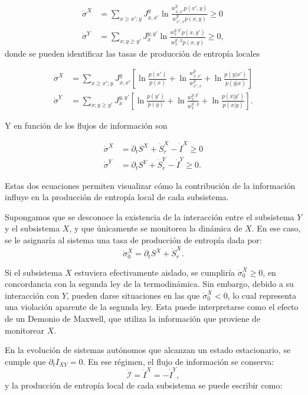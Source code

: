 \begin{align*}
    \dot{\sigma}^{X} & = \sum_{x \geq x';y} J_{x,x'}^{y} \ln  \frac{w_{x,x'}^{y} p(x',y) }{w_{x',x}^{y} p(x,y) } \geq 0 \\
    \dot{\sigma}^{Y} & = \sum_{x;y\geq y'}J_{x}^{y,y'} \ln \frac{w_{x}^{y,y'} p(x,y') }{ w_{x}^{y',y} p(x,y) } \geq 0, 
\end{align*}
donde se pueden identificar las tasas de producción de entropía locales

\begin{align*}
    \dot{\sigma}^{X} &  = \sum_{x \geq x';y} J_{x,x'}^{y} \left[ \ln \frac{p(x')}{p(x)}  +\ln \frac{w_{x,x'}^{y}}{ w_{x',x}^{y} } + \ln \frac{p(y|x')}{p(y|x)} \right] \\
    \dot{\sigma}^{Y} &  = \sum_{x;y \geq y'} J_{x}^{y,y'} \left[ \ln \frac{p(y')}{p(y)}  + \ln \frac{w_{x}^{y,y'}}{ w_{x}^{y',y} } + \ln \frac{p(x|y')}{p(x|y)} \right].
\end{align*}

Y en función de los flujos de información son  

\begin{align*}
    \dot{\sigma}^{X} & = \partial_{t}S^{X} + \dot{S}_{r}^{X} - \dot{I}^{X} \geq 0 \\
    \dot{\sigma}^{Y} & = \partial_{t}S^{Y} + \dot{S}_{r}^{Y} - \dot{I}^{Y} \geq 0.
\end{align*}

Estas dos ecuaciones permiten visualizar cómo la contribución de la información influye en la producción de entropía local de cada subsistema.

Supongamos que se desconoce la existencia de la interacción entre el subsistema \( Y \) y el subsistema \( X \), y que únicamente se monitorea la dinámica de \( X \). En ese caso, se le asignaría al sistema una tasa de producción de entropía dada por:
\[
\dot{\sigma}^{X}_0 = \partial_t S^X + \dot{S}_r^X.
\]

Si el subsistema \( X \) estuviera efectivamente aislado, se cumpliría \( \dot{\sigma}^{X}_0 \geq 0 \), en concordancia con la segunda ley de la termodinámica. Sin embargo, debido a su interacción con \( Y \), pueden darse situaciones en las que \( \dot{\sigma}^{X}_0 < 0 \), lo cual representa una violación aparente de la segunda ley. Esta puede interpretarse como el efecto de un Demonio de Maxwell, que utiliza la información que proviene de monitorear \(X \).

En la evolución de sistemas autónomos que alcanzan un estado estacionario, se cumple que \( \partial_t I_{XY} = 0 \). En ese régimen, el flujo de información se conserva:
\[
\dot{\mathcal{I}} = \dot{I}^{X} = -\dot{I}^{Y},
\]
y la producción de entropía local de cada subsistema se puede escribir como:


